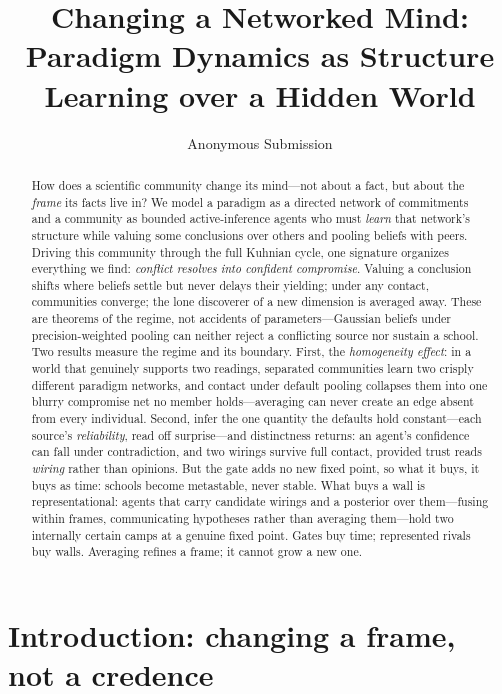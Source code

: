 \documentclass[runningheads]{llncs}
\title{Changing a Networked Mind: Paradigm Dynamics as Structure Learning over a Hidden World}
\author{Anonymous Submission}
\institute{Anonymous Institution(s)}
\begin{document}
\maketitle

\begin{abstract}
How does a scientific community change its mind---not about a fact, but about the \emph{frame} its
facts live in? We model a paradigm as a directed network of commitments and a community as bounded
active-inference agents who must \emph{learn} that network's structure while valuing some
conclusions over others and pooling beliefs with peers. Driving this community through the full
Kuhnian cycle, one signature organizes everything we find: \emph{conflict
resolves into confident compromise}. Valuing a conclusion shifts where beliefs settle but never
delays their yielding; under any contact, communities converge; the lone discoverer of a new
dimension is averaged away. These are theorems of the regime, not accidents of
parameters---Gaussian beliefs under precision-weighted pooling can neither reject a conflicting
source nor sustain a school. Two results measure the regime and its boundary. First, the
\emph{homogeneity effect}: in a world that genuinely supports two readings, separated
communities learn two crisply different paradigm networks, and contact under default pooling
collapses them into one blurry compromise net no member holds---averaging can never create an
edge absent from every individual. Second, infer the one quantity the defaults hold
constant---each source's \emph{reliability}, read off surprise---and distinctness returns: an
agent's confidence can fall under contradiction, and two wirings survive full contact, provided
trust reads \emph{wiring} rather than opinions. But the gate adds no new fixed point, so what it
buys, it buys as time: schools become metastable, never stable. What buys a wall is
representational: agents that carry candidate wirings and a posterior over them---fusing
within frames, communicating hypotheses rather than averaging them---hold two internally
certain camps at a genuine fixed point. Gates buy time; represented rivals buy walls.
Averaging refines a frame; it cannot grow a new one.

\end{abstract}

\section{Introduction: changing a frame, not a credence}
\label{sec:background}
\end{document}
